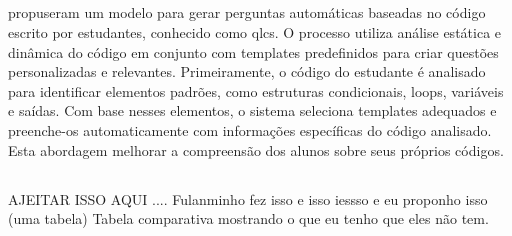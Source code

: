 \subsection{}
\cite {lehtinen2021} propuseram um modelo para gerar perguntas automáticas baseadas no código escrito por estudantes, conhecido como  \gls{qlcs}. O processo utiliza análise estática e dinâmica do código em conjunto com templates predefinidos para criar questões personalizadas e relevantes. Primeiramente, o código do estudante é analisado para identificar elementos padrões, como estruturas condicionais, loops, variáveis e saídas. Com base nesses elementos, o sistema seleciona templates adequados e preenche-os automaticamente com informações específicas do código analisado. Esta abordagem melhorar a compreensão dos alunos sobre seus próprios códigos. 

 \subsection{}
AJEITAR ISSO AQUI .... Fulanminho fez isso e isso iessso e eu proponho isso (uma tabela) Tabela comparativa mostrando o que eu tenho que eles não tem.


